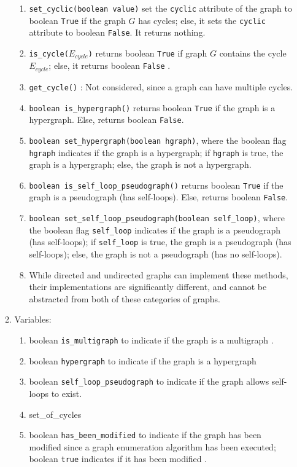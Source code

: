 \begin{enumerate}
\begin{enumerate}
\begin{enumerate}
		\item {\tt set\_cyclic(boolean value)} set the {\tt cyclic} attribute of the graph to boolean {\tt True} if the graph $G$ has cycles; else, it sets the {\tt cyclic} attribute to boolean {\tt False}. It returns nothing.
		\item {\tt is\_cycle($E_{cycle}$)} returns boolean {\tt True} if graph $G$ contains the cycle $E_{cycle}$; else, it returns boolean {\tt False} \cite[\S52.4, pp. 850]{Goldman2008}.
		\item {\tt get\_cycle()} \cite[\S52.4, pp. 850]{Goldman2008}: Not considered, since a graph can have multiple cycles.
		\item {\tt boolean is\_hypergraph()} returns boolean {\tt True} if the graph is a hypergraph. Else, returns boolean {\tt False}.
		\item {\tt boolean set\_hypergraph(boolean hgraph)}, where the boolean flag {\tt hgraph} indicates if the graph is a hypergraph; if {\tt hgraph} is true, the graph is a hypergraph; else, the graph is not a hypergraph.
		\item {\tt boolean is\_self\_loop\_pseudograph()} returns boolean {\tt True} if the graph is a pseudograph (has self-loops). Else, returns boolean {\tt False}.
		\item {\tt boolean set\_self\_loop\_pseudograph(boolean self\_loop)}, where the boolean flag {\tt self\_loop} indicates if the graph is a pseudograph (has self-loops); if {\tt self\_loop} is true, the graph is a pseudograph (has self-loops); else, the graph is not a pseudograph (has no self-loops).
		\item While directed and undirected graphs can implement these methods, their implementations are significantly different, and cannot be abstracted from both of these categories of graphs.
		\end{enumerate}
	\item Variables: \vspace{-0.2cm}
		\begin{enumerate} \itemsep -2pt
		\item boolean {\tt is\_multigraph} to indicate if the graph is a multigraph \cite[\S53, pp. 857]{Goldman2008}.
		\item boolean {\tt hypergraph} to indicate if the graph is a hypergraph
		\item boolean {\tt self\_loop\_pseudograph} to indicate if the graph allows self-loops to exist. 
		\item set\_of\_cycles
		\item boolean {\tt has\_been\_modified} to indicate if the graph has been modified since a graph enumeration algorithm has been executed; boolean {\tt true} indicates if it has been modified \cite[\S53.1, pp. 858]{Goldman2008}.

\end{enumerate}
\end{enumerate}
\end{enumerate}

